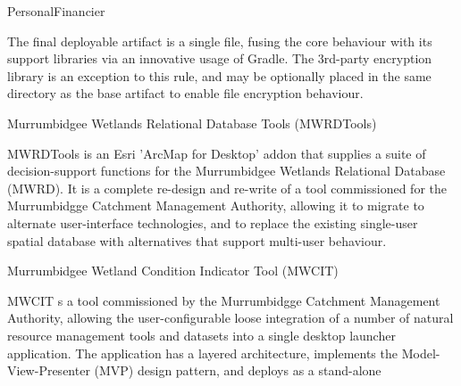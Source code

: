 \documentclass{portfolio}
\begin{document}
\begin{Projects}
\begin{Project}{PersonalFinancier}
\begin{ProjectOverview}
        The final deployable artifact is a single file, fusing the core behaviour with its support libraries via an innovative usage of 
        Gradle. The 3rd-party encryption library is an exception to this rule, and may be optionally placed in the same directory as the 
        base artifact to enable file encryption behaviour.
      \end{ProjectOverview}
    \end{Project}
    \begin{Project}{Murrumbidgee Wetlands Relational Database Tools (MWRDTools)}
      \begin{ProjectOverview}
        MWRDTools is an Esri 'ArcMap for Desktop' addon that supplies a suite of decision-support functions for the Murrumbidgee Wetlands Relational Database (MWRD).
        It is a complete re-design and re-write of a tool commissioned for the Murrumbidgge Catchment Management Authority, allowing it to migrate to alternate user-interface
        technologies, and to replace the existing single-user spatial database with alternatives that support multi-user behaviour.
      \end{ProjectOverview}
    \end{Project}
    \begin{Project}{Murrumbidgee Wetland Condition Indicator Tool (MWCIT)}
      \begin{ProjectOverview}
        MWCIT s a tool commissioned by the Murrumbidgge Catchment Management Authority, allowing the user-configurable loose integration
        of a number of natural resource management tools and datasets into a single desktop launcher application. 
        The application has a layered architecture, implements the Model-View-Presenter (MVP) design pattern, and deploys as a stand-alone 

\end{ProjectOverview}
\end{Project}
\end{Projects}
\end{document}
